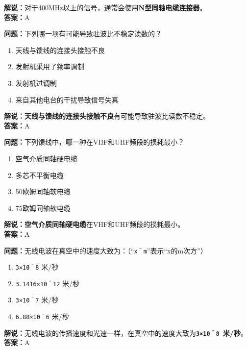 \textbf{解说：}对于400MHz以上的信号，通常会使用\textbf{N型同轴电缆连接器}。\\\textbf{答案：}A%



\textbf{问题：}下列哪一项有可能导致驻波比不稳定读数的？

\begin{enumerate}[label=\Alph*), leftmargin=1cm]
	\item 天线与馈线的连接头接触不良
	\item 发射机采用了频率调制
	\item 发射机过调制
	\item 来自其他电台的干扰导致信号失真
\end{enumerate}

\textbf{解说：}\textbf{天线与馈线的连接头接触不良}有可能导致驻波比读数不稳定。\\\textbf{答案：}A%



\textbf{问题：}下列馈线中，哪一种在VHF和UHF频段的损耗最小？

\begin{enumerate}[label=\Alph*), leftmargin=1cm]
	\item 空气介质同轴硬电缆
	\item 多芯不平衡电缆
	\item 50欧姆同轴软电缆
	\item 75欧姆同轴软电缆
\end{enumerate}

\textbf{解说：}\textbf{空气介质同轴硬电缆}在VHF和UHF频段的损耗最小。\\\textbf{答案：}A%



\textbf{问题：}无线电波在真空中的速度大致为：（“\texttt{x＾m}”表示“x的m次方”）

\begin{enumerate}[label=\Alph*), leftmargin=1cm]
	\item \texttt{3×10＾8} 米/秒
	\item \texttt{3.1416×10＾12} 米/秒
	\item \texttt{3×10＾7} 米/秒
	\item \texttt{6.88×10＾6} 米/秒
\end{enumerate}

\textbf{解说：}无线电波的传播速度和光速一样，在真空中的速度大致为\textbf{\texttt{3×10＾8 }米/秒}。\\\textbf{答案：}A%



